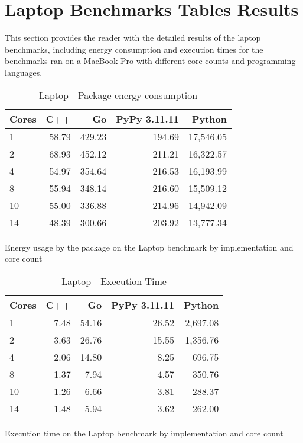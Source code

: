 \section{Laptop Benchmarks Tables Results}

This section provides the reader with the detailed results of the laptop benchmarks, including energy consumption and execution times for the benchmarks ran on a MacBook Pro with different core counts and programming languages.

\begin{table}[H]
    \centering
    \begin{tabular}{lrrrr}
        \hline
        Cores & C++   & Go       & PyPy 3.11.11 & Python      \\
        \hline
        1     & 58.79  & 429.23  & 194.69       & 17,546.05   \\
        2     & 68.93  & 452.12  & 211.21       & 16,322.57   \\
        4     & 54.97  & 354.64  & 216.53       & 16,193.99   \\
        8     & 55.94  & 348.14  & 216.60       & 15,509.12   \\
        10    & 55.00  & 336.88  & 214.96       & 14,942.09   \\
        14    & 48.39  & 300.66  & 203.92       & 13,777.34   \\
        \hline
    \end{tabular}
\caption{Laptop - Package energy consumption}{Energy usage by the package on the Laptop benchmark by implementation and core count}
\label{tab:mbp-power-consumption}
\end{table}

\begin{table}[H]
    \centering
    \begin{tabular}{lrrrr}
        \hline
        Cores & C++  & Go    & PyPy 3.11.11 & Python    \\
        \hline
        1     & 7.48  & 54.16  & 26.52        & 2,697.08  \\
        2     & 3.63  & 26.76  & 15.55        & 1,356.76  \\
        4     & 2.06  & 14.80  & 8.25         & 696.75    \\
        8     & 1.37  & 7.94   & 4.57         & 350.76    \\
        10    & 1.26  & 6.66   & 3.81         & 288.37    \\
        14    & 1.48  & 5.94   & 3.62         & 262.00    \\
        \hline
    \end{tabular}
\caption{Laptop - Execution Time}{Execution time on the Laptop benchmark by implementation and core count}
\label{tab:mbp-time-execution}
\end{table}


